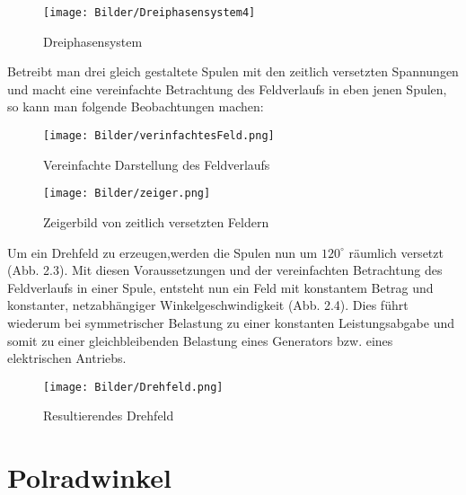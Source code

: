 

\begin{figure}[H]
	\centering
	\texttt{[image: Bilder/Dreiphasensystem4]} %
	\caption{Dreiphasensystem }
	\label{fig: Dreiphasensystem}
\end{figure}

Betreibt man drei gleich gestaltete Spulen mit den zeitlich versetzten Spannungen und macht eine vereinfachte Betrachtung des Feldverlaufs in eben jenen Spulen, so kann man folgende Beobachtungen machen:

\begin{figure}[H]
	\centering
	\texttt{[image: Bilder/verinfachtesFeld.png]} %
	\caption{Vereinfachte Darstellung des Feldverlaufs \cite{albach}\\}
	\label{fig: Fluss Spule}
\end{figure}


\begin{figure}[H]
	\centering
	\texttt{[image: Bilder/zeiger.png]} %
	\caption{Zeigerbild von zeitlich versetzten Feldern \cite{albach}\\}
	\label{fig: Fluss Spule}
\end{figure}

Um ein Drehfeld zu erzeugen,werden die Spulen nun um \(120^\circ\) räumlich versetzt (Abb. 2.3). Mit diesen Voraussetzungen und der vereinfachten Betrachtung des Feldverlaufs in einer Spule, entsteht nun ein Feld mit konstantem Betrag und konstanter, netzabhängiger Winkelgeschwindigkeit (Abb. 2.4). Dies führt wiederum bei symmetrischer Belastung zu einer konstanten Leistungsabgabe und somit zu einer gleichbleibenden Belastung eines Generators bzw. eines elektrischen Antriebs. \cite{weissgerber}

\begin{figure}[H]
	\centering
	\texttt{[image: Bilder/Drehfeld.png]} %
	\caption{Resultierendes Drehfeld \cite{albach}\\}
	\label{fig: Drehfeld}
\end{figure}


\section{Polradwinkel}


